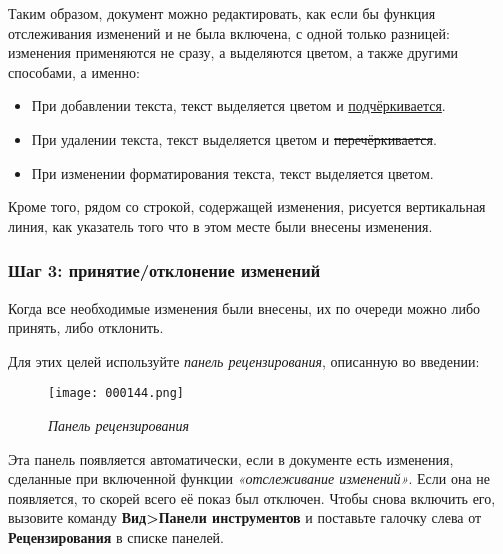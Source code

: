 ﻿\documentclass[a4paper,10pt]{article}
\begin{document}
Таким образом, документ можно редактировать, как если бы функция отслеживания изменений и не была включена, с одной только разницей: изменения применяются не сразу, а выделяются цветом, а также другими способами, а именно:

\begin{itemize}
 \item При добавлении текста, текст выделяется цветом и \underline{подчёркивается}.
 \item При удалении текста, текст выделяется цветом и \sout{перечёркивается}.
 \item При изменении форматирования текста, текст выделяется цветом.
\end{itemize}

Кроме того, рядом со строкой, содержащей изменения, рисуется вертикальная линия, как указатель того что в этом месте были внесены изменения.

\subsubsection{Шаг 3: принятие/отклонение изменений}
Когда все необходимые изменения были внесены, их по очереди можно либо принять, либо отклонить.

Для этих целей используйте \textit{панель рецензирования}, описанную во введении: 

\begin{figure}[ht]
\texttt{[image: 000144.png]}
\centering
\caption{\textit{Панель рецензирования}}
\end{figure}

Эта панель появляется автоматически, если в документе есть изменения, сделанные при включенной функции \textit{«отслеживание изменений»}. Если она не появляется, то скорей всего её показ был отключен. Чтобы снова включить его, вызовите команду \textbf{Вид>Панели инструментов} и поставьте галочку слева от \textbf{Рецензирования} в списке панелей.
\end{document}
